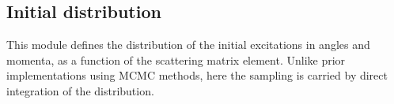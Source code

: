 \documentclass[letterpaper,10pt,english]{sphinxmanual}
\begin{document}
\subsection{Initial distribution}
\label{\detokenize{code_structure:module-scdc.initial.distribution.integral}}\label{\detokenize{code_structure:initial-distribution}}
This module defines the distribution of the initial excitations in angles
and momenta, as a function of the scattering matrix element. Unlike prior
implementations using MCMC methods, here the sampling is carried by direct
integration of the distribution.
\end{document}
